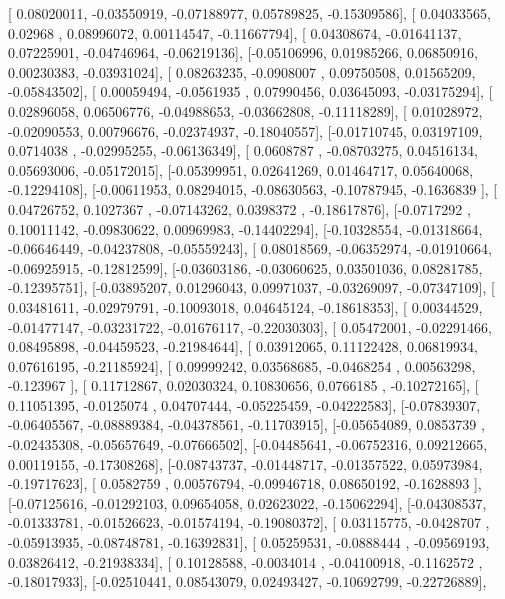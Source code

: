 \documentclass{article}
\begin{document}
       [ 0.08020011, -0.03550919, -0.07188977,  0.05789825, -0.15309586],
       [ 0.04033565,  0.02968   ,  0.08996072,  0.00114547, -0.11667794],
       [ 0.04308674, -0.01641137,  0.07225901, -0.04746964, -0.06219136],
       [-0.05106996,  0.01985266,  0.06850916,  0.00230383, -0.03931024],
       [ 0.08263235, -0.0908007 ,  0.09750508,  0.01565209, -0.05843502],
       [ 0.00059494, -0.0561935 ,  0.07990456,  0.03645093, -0.03175294],
       [ 0.02896058,  0.06506776, -0.04988653, -0.03662808, -0.11118289],
       [ 0.01028972, -0.02090553,  0.00796676, -0.02374937, -0.18040557],
       [-0.01710745,  0.03197109,  0.0714038 , -0.02995255, -0.06136349],
       [ 0.0608787 , -0.08703275,  0.04516134,  0.05693006, -0.05172015],
       [-0.05399951,  0.02641269,  0.01464717,  0.05640068, -0.12294108],
       [-0.00611953,  0.08294015, -0.08630563, -0.10787945, -0.1636839 ],
       [ 0.04726752,  0.1027367 , -0.07143262,  0.0398372 , -0.18617876],
       [-0.0717292 ,  0.10011142, -0.09830622,  0.00969983, -0.14402294],
       [-0.10328554, -0.01318664, -0.06646449, -0.04237808, -0.05559243],
       [ 0.08018569, -0.06352974, -0.01910664, -0.06925915, -0.12812599],
       [-0.03603186, -0.03060625,  0.03501036,  0.08281785, -0.12395751],
       [-0.03895207,  0.01296043,  0.09971037, -0.03269097, -0.07347109],
       [ 0.03481611, -0.02979791, -0.10093018,  0.04645124, -0.18618353],
       [ 0.00344529, -0.01477147, -0.03231722, -0.01676117, -0.22030303],
       [ 0.05472001, -0.02291466,  0.08495898, -0.04459523, -0.21984644],
       [ 0.03912065,  0.11122428,  0.06819934,  0.07616195, -0.21185924],
       [ 0.09999242,  0.03568685, -0.0468254 ,  0.00563298, -0.123967  ],
       [ 0.11712867,  0.02030324,  0.10830656,  0.0766185 , -0.10272165],
       [ 0.11051395, -0.0125074 ,  0.04707444, -0.05225459, -0.04222583],
       [-0.07839307, -0.06405567, -0.08889384, -0.04378561, -0.11703915],
       [-0.05654089,  0.0853739 , -0.02435308, -0.05657649, -0.07666502],
       [-0.04485641, -0.06752316,  0.09212665,  0.00119155, -0.17308268],
       [-0.08743737, -0.01448717, -0.01357522,  0.05973984, -0.19717623],
       [ 0.0582759 ,  0.00576794, -0.09946718,  0.08650192, -0.1628893 ],
       [-0.07125616, -0.01292103,  0.09654058,  0.02623022, -0.15062294],
       [-0.04308537, -0.01333781, -0.01526623, -0.01574194, -0.19080372],
       [ 0.03115775, -0.0428707 , -0.05913935, -0.08748781, -0.16392831],
       [ 0.05259531, -0.0888444 , -0.09569193,  0.03826412, -0.21938334],
       [ 0.10128588, -0.0034014 , -0.04100918, -0.1162572 , -0.18017933],
       [-0.02510441,  0.08543079,  0.02493427, -0.10692799, -0.22726889],
\end{document}
